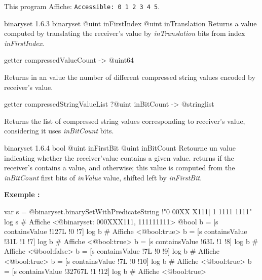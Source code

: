 This program Affiche: \texttt{Accessible: 0 1 2 3 4 5}.




{binaryset}
{1.6.3}
{binaryset}
{@uint inFirstIndex}
{@uint inTranslation}
{Returns a  value computed by translating the receiver's value by \emph{inTranslation} bits from index \emph{inFirstIndex}.}
{}




\begin{galgascode}
getter compressedValueCount -> @uint64
\end{galgascode}

Returns in an  value the number of different compressed string values encoded by receiver's value.




\begin{galgascode}
getter compressedStringValueList ?@uint inBitCount -> @stringlist
\end{galgascode}

Returns the list of compressed string values corresponding to receiver's value, considering it uses \emph{inBitCount} bits.










{binaryset}
{1.6.4}
{bool}
{@uint inFirstBit}
{@uint inBitCount}
{Retourne un  value indicating whether the receiver'value contains a given value.}
{returns  if the receiver's contains a value, and  otherwise; this value is computed from the \emph{inBitCount} first bits of \emph{inValue} value, shifted left by \emph{inFirstBit}.}


\textbf{Exemple :}
\begin{galgascode}
var s = @binaryset.binarySetWithPredicateString {!"0 00XX X111| 1 1111 1111"}
log s # Affiche <@binaryset: 000XXX111, 111111111>
@bool b = [s containsValue !127L !0 !7]
log b # Affiche <@bool:true>
b = [s containsValue !31L !1 !7]
log b # Affiche <@bool:true>
b = [s containsValue !63L !1 !8]
log b # Affiche <@bool:false>
b = [s containsValue !7L !0 !9]
log b # Affiche <@bool:true>
b = [s containsValue !7L !0 !10]
log b # Affiche <@bool:true>
b = [s containsValue !32767L !1 !12]
log b # Affiche <@bool:true>
\end{galgascode}








